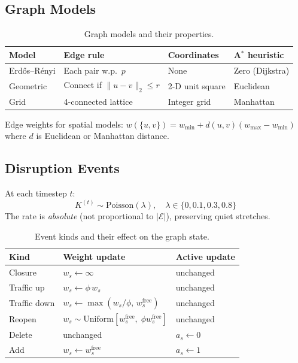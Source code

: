\documentclass[11pt,a4paper]{article}
\theoremstyle{definition}
\newcommand{\calE}{\mathcal{E}}
\begin{document}
\subsection{Graph Models}

\begin{table}[h]\centering
  \caption{Graph models and their properties.}
  \begin{tabular}{llll}
    \toprule
    Model & Edge rule & Coordinates & A$^*$ heuristic \\
    \midrule
    Erd\H{o}s--R\'enyi & Each pair w.p.\ $p$ & None & Zero (Dijkstra) \\
    Geometric & Connect if $\|u-v\|_2\le r$ & 2-D unit square & Euclidean \\
    Grid & 4-connected lattice & Integer grid & Manhattan \\
    \bottomrule
  \end{tabular}
\end{table}

Edge weights for spatial models:
$w(\{u,v\}) = w_{\min} + d(u,v)(w_{\max}-w_{\min})$
where $d$ is Euclidean or Manhattan distance.

\subsection{Disruption Events}

At each timestep $t$:
\[
  K^{(t)} \sim \mathrm{Poisson}(\lambda),\quad \lambda\in\{0,0.1,0.3,0.8\}
\]
The rate is \emph{absolute} (not proportional to $|\calE|$), preserving quiet stretches.

\begin{table}[h]\centering
  \caption{Event kinds and their effect on the graph state.}
  \label{tab:events}
  \begin{tabular}{lll}
    \toprule
    Kind & Weight update & Active update \\
    \midrule
    Closure     & $w_s \leftarrow \infty$ & unchanged \\
    Traffic up  & $w_s \leftarrow \phi\,w_s$ & unchanged \\
    Traffic down& $w_s \leftarrow \max(w_s/\phi,\,w^{\text{free}}_s)$ & unchanged \\
    Reopen      & $w_s \sim \text{Uniform}[w^{\text{free}}_s,\;\phi w^{\text{free}}_s]$ & unchanged \\
    Delete      & unchanged & $a_s\leftarrow 0$ \\
    Add         & $w_s\leftarrow w^{\text{free}}_s$ & $a_s\leftarrow 1$ \\
    \bottomrule
  \end{tabular}
\end{table}
\end{document}
